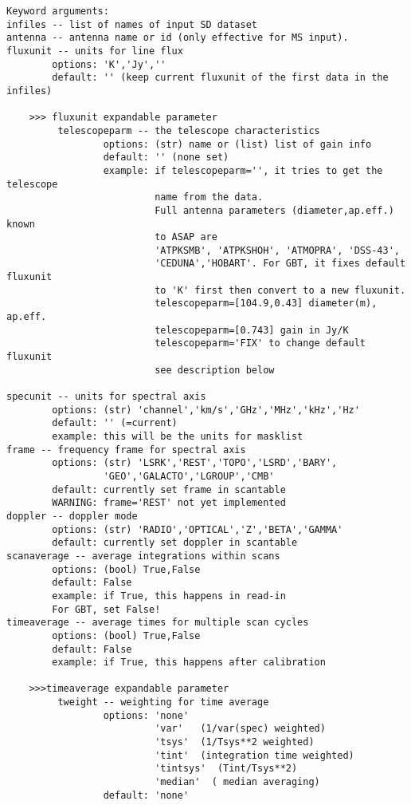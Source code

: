 \begin{verbatim}
Keyword arguments:
infiles -- list of names of input SD dataset
antenna -- antenna name or id (only effective for MS input). 
fluxunit -- units for line flux
        options: 'K','Jy',''
        default: '' (keep current fluxunit of the first data in the infiles)

    >>> fluxunit expandable parameter
         telescopeparm -- the telescope characteristics
                 options: (str) name or (list) list of gain info
                 default: '' (none set)
                 example: if telescopeparm='', it tries to get the telescope
                          name from the data.
                          Full antenna parameters (diameter,ap.eff.) known
                          to ASAP are
                          'ATPKSMB', 'ATPKSHOH', 'ATMOPRA', 'DSS-43',
                          'CEDUNA','HOBART'. For GBT, it fixes default fluxunit
                          to 'K' first then convert to a new fluxunit.
                          telescopeparm=[104.9,0.43] diameter(m), ap.eff.
                          telescopeparm=[0.743] gain in Jy/K
                          telescopeparm='FIX' to change default fluxunit
                          see description below

specunit -- units for spectral axis
        options: (str) 'channel','km/s','GHz','MHz','kHz','Hz'
        default: '' (=current)
        example: this will be the units for masklist
frame -- frequency frame for spectral axis
        options: (str) 'LSRK','REST','TOPO','LSRD','BARY',
                 'GEO','GALACTO','LGROUP','CMB'
        default: currently set frame in scantable
        WARNING: frame='REST' not yet implemented
doppler -- doppler mode
        options: (str) 'RADIO','OPTICAL','Z','BETA','GAMMA'
        default: currently set doppler in scantable
scanaverage -- average integrations within scans
        options: (bool) True,False
        default: False
        example: if True, this happens in read-in
        For GBT, set False!
timeaverage -- average times for multiple scan cycles
        options: (bool) True,False
        default: False
        example: if True, this happens after calibration

    >>>timeaverage expandable parameter
         tweight -- weighting for time average
                 options: 'none' 
                          'var'   (1/var(spec) weighted)
                          'tsys'  (1/Tsys**2 weighted)
                          'tint'  (integration time weighted)
                          'tintsys'  (Tint/Tsys**2)
                          'median'  ( median averaging)
                 default: 'none'


\end{verbatim}

